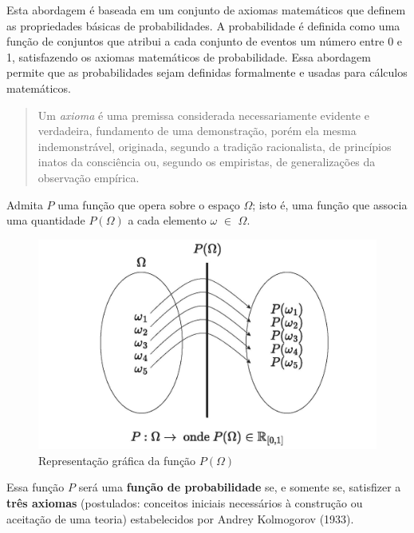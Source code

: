 \documentclass[
]{book}
\begin{document}
\hfill\break

Esta abordagem é baseada em um conjunto de axiomas matemáticos que definem as propriedades básicas de probabilidades. A probabilidade é definida como uma função de conjuntos que atribui a cada conjunto de eventos um número entre 0 e 1, satisfazendo os axiomas matemáticos de probabilidade. Essa abordagem permite que as probabilidades sejam definidas formalmente e usadas para cálculos matemáticos.

\hfill\break

\begin{quote}
Um \emph{axioma} é uma premissa considerada necessariamente evidente e verdadeira, fundamento de uma demonstração, porém ela mesma indemonstrável, originada, segundo a tradição racionalista, de princípios inatos da consciência ou, segundo os empiristas, de generalizações da observação empírica.
\end{quote}

\hfill\break

Admita \(P\) uma função que opera sobre o espaço \(\Omega\); isto é, uma função que associa uma quantidade \(P(\Omega)\) a cada elemento \(\omega\) \(\in\) \(\Omega\).

\hfill\break

\begin{figure}

{\centering \includegraphics[width=0.8\linewidth]{images4/funcao_probabilidade} 

}

\caption{Representação gráfica da função $P(\Omega)$}\label{fig:unnamed-chunk-61}
\end{figure}

\hfill\break

Essa função \(P\) será uma \textbf{função de probabilidade} se, e somente se, satisfizer a \textbf{três axiomas} (postulados: conceitos iniciais necessários à construção ou aceitação de uma teoria) estabelecidos por Andrey Kolmogorov (1933).
\end{document}
